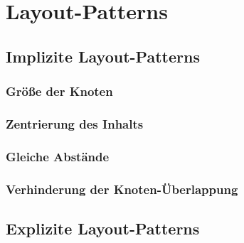\section{Layout-Patterns}
\label{sec:layout-patterns}




\subsection{Implizite Layout-Patterns}

\subsubsection{Größe der Knoten}
\subsubsection{Zentrierung des Inhalts}
\subsubsection{Gleiche Abstände}
\subsubsection{Verhinderung der Knoten-Überlappung}

\subsection{Explizite Layout-Patterns}

